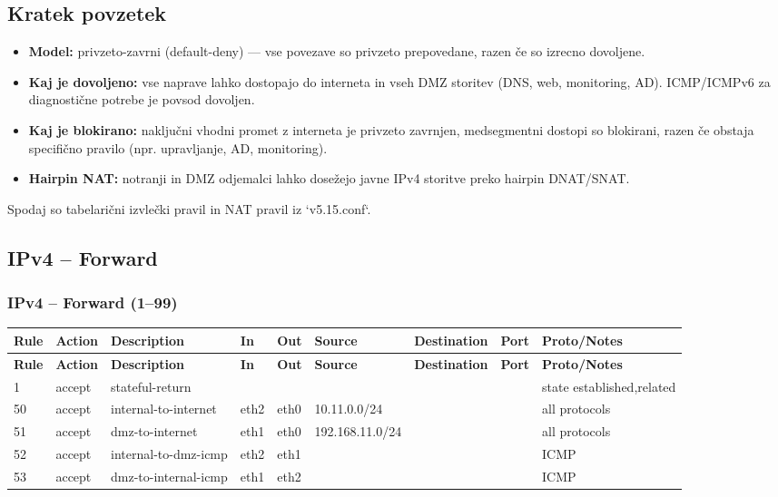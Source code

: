 \documentclass[a4paper,11pt]{article}
\begin{document}
\begin{landscape}
\subsection{Kratek povzetek}
\begin{itemize}
  \item \textbf{Model:} privzeto-zavrni (default-deny) — vse povezave so privzeto prepovedane, razen če so izrecno dovoljene.
  \item \textbf{Kaj je dovoljeno:} vse naprave lahko dostopajo do interneta in vseh DMZ storitev (DNS, web, monitoring, AD). ICMP/ICMPv6 za diagnostične potrebe je povsod dovoljen.
  \item \textbf{Kaj je blokirano:} naključni vhodni promet z interneta je privzeto zavrnjen, medsegmentni dostopi so blokirani, razen če obstaja specifično pravilo (npr. upravljanje, AD, monitoring).
  \item \textbf{Hairpin NAT:} notranji in DMZ odjemalci lahko dosežejo javne IPv4 storitve preko hairpin DNAT/SNAT.
\end{itemize}
Spodaj so tabelarični izvlečki pravil in NAT pravil iz `v5.15.conf`.

\subsection{IPv4 -- Forward}
\subsubsection{IPv4 -- Forward (1--99)}
\begin{longtable}{|l|l|l|l|l|l|l|p{2.2cm}|l|}
\hline
\textbf{Rule} & \textbf{Action} & \textbf{Description} & \textbf{In} & \textbf{Out} & \textbf{Source} & \textbf{Destination} & \textbf{Port} & \textbf{Proto/Notes} \\
\hline
\endfirsthead
\hline
\textbf{Rule} & \textbf{Action} & \textbf{Description} & \textbf{In} & \textbf{Out} & \textbf{Source} & \textbf{Destination} & \textbf{Port} & \textbf{Proto/Notes} \\
\hline
\endhead
1 & accept & stateful-return & & & & & & state established,related \\
50 & accept & internal-to-internet & eth2 & eth0 & 10.11.0.0/24 & & & all protocols \\
51 & accept & dmz-to-internet & eth1 & eth0 & 192.168.11.0/24 & & & all protocols \\
52 & accept & internal-to-dmz-icmp & eth2 & eth1 & & & & ICMP \\
53 & accept & dmz-to-internal-icmp & eth1 & eth2 & & & & ICMP \\
\hline
\end{longtable}


\end{landscape}
\end{document}
